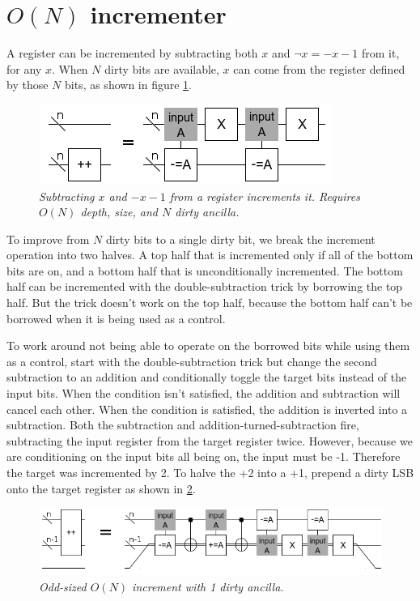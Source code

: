 \documentclass[twocolumn]{article}
\begin{document}
\section{$O(N)$ incrementer}

A register can be incremented by subtracting both $x$ and $\neg x = -x-1$ from it, for any $x$.
When $N$ dirty bits are available, $x$ can come from the register defined by those $N$ bits, as shown in figure \ref{fig:double-sub-increment}.

\begin{figure}
  \centering
  \includegraphics[totalheight=2cm]{double-sub-increment.png}
  \caption{\em Subtracting $x$ and $-x-1$ from a register increments it. Requires $O(N)$ depth, size, and $N$ dirty ancilla.}
  \label{fig:double-sub-increment}
\end{figure}

To improve from $N$ dirty bits to a single dirty bit, we break the increment operation into two halves.
A top half that is incremented only if all of the bottom bits are on, and a bottom half that is unconditionally incremented.
The bottom half can be incremented with the double-subtraction trick by borrowing the top half.
But the trick doesn't work on the top half, because the bottom half can't be borrowed when it is being used as a control.

To work around not being able to operate on the borrowed bits while using them as a control, start with the double-subtraction trick but change the second subtraction to an addition and conditionally toggle the target bits instead of the input bits.
When the condition isn't satisfied, the addition and subtraction will cancel each other.
When the condition is satisfied, the addition is inverted into a subtraction.
Both the subtraction and addition-turned-subtraction fire, subtracting the input register from the target register twice.
However, because we are conditioning on the input bits all being on, the input must be -1.
Therefore the target was incremented by 2.
To halve the +2 into a +1, prepend a dirty LSB onto the target register as shown in \ref{fig:compact-increment}.

\begin{figure}
  \centering
  \includegraphics[totalheight=1.5cm]{compact-increment.png}
  \caption{\em Odd-sized $O(N)$ increment with 1 dirty ancilla.}
  \label{fig:compact-increment}
\end{figure}
\end{document}
